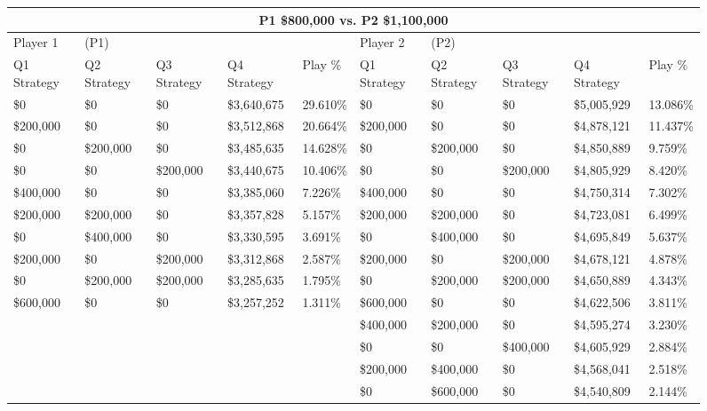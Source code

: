 \documentclass[11pt]{article}
\begin{document}
\begin{figure}
\tiny
\begin{tabular}{ |p{1.0cm}p{1.0cm}p{1.0cm}p{2.0cm}|p{1.0cm}||p{1.0cm}p{1.0cm}p{1.0cm}p{2.0cm}|p{1.0cm}|}
\hline
\multicolumn{10}{|c|}{P1 \$800,000 vs. P2 \$1,100,000} \\
\hline
Player 1 & (P1) & & & & Player 2 & (P2) & & & \\
\hline
Q1 Strategy & Q2 Strategy & Q3 Strategy & Q4 Strategy  &  Play \% & Q1 Strategy & Q2 Strategy & Q3 Strategy & Q4 Strategy  &  Play \%\\
\hline
\$0 & \$0 & \$0 & \$3,640,675  & 29.610\%           & \$0 & \$0 & \$0 & \$5,005,929  & 13.086\% \\
\$200,000 & \$0 & \$0 & \$3,512,868  & 20.664\%     & \$200,000 & \$0 & \$0 & \$4,878,121  & 11.437\% \\
\$0& \$200,000 & \$0 & \$3,485,635  & 14.628\%      & \$0& \$200,000 & \$0 & \$4,850,889  & 9.759\% \\
\$0 & \$0& \$200,000 & \$3,440,675  & 10.406\%      & \$0 & \$0& \$200,000 & \$4,805,929  & 8.420\% \\
\$400,000 & \$0 & \$0 & \$3,385,060  & 7.226\%      & \$400,000 & \$0 & \$0 & \$4,750,314  & 7.302\% \\
\$200,000& \$200,000 & \$0 & \$3,357,828  & 5.157\% & \$200,000& \$200,000 & \$0 & \$4,723,081  & 6.499\% \\
\$0& \$400,000 & \$0 & \$3,330,595  & 3.691\%       & \$0& \$400,000 & \$0 & \$4,695,849  & 5.637\% \\
\$200,000 & \$0& \$200,000 & \$3,312,868  & 2.587\% & \$200,000 & \$0& \$200,000 & \$4,678,121  & 4.878\% \\
\$0& \$200,000& \$200,000 & \$3,285,635  & 1.795\%  & \$0& \$200,000& \$200,000 & \$4,650,889  & 4.343\% \\
\$600,000 & \$0 & \$0 & \$3,257,252  & 1.311\%       & \$600,000 & \$0 & \$0 & \$4,622,506  & 3.811\% \\
&&&&                                                & \$400,000& \$200,000 & \$0 & \$4,595,274  & 3.230\% \\
&&&&                                                & \$0 & \$0& \$400,000 & \$4,605,929  & 2.884\% \\
&&&&                                                & \$200,000& \$400,000 & \$0 & \$4,568,041  & 2.518\% \\
&&&&                                                & \$0 & \$600,000 & \$0 & \$4,540,809  & 2.144\% \\

\end{tabular}
\end{figure}
\end{document}
